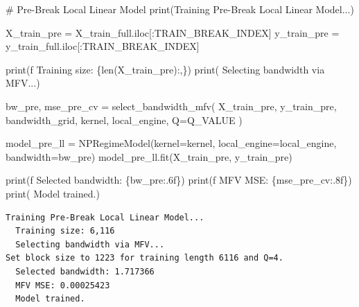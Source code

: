 \documentclass[
  letterpaper,
  DIV=11,
  numbers=noendperiod]{scrartcl}
\newenvironment{Shaded}{\begin{snugshade}}{\end{snugshade}}
\newcommand{\BuiltInTok}[1]{\textcolor[rgb]{0.00,0.23,0.31}{#1}}
\newcommand{\CommentTok}[1]{\textcolor[rgb]{0.37,0.37,0.37}{#1}}
\newcommand{\NormalTok}[1]{\textcolor[rgb]{0.00,0.23,0.31}{#1}}
\newcommand{\OperatorTok}[1]{\textcolor[rgb]{0.37,0.37,0.37}{#1}}
\newcommand{\SpecialCharTok}[1]{\textcolor[rgb]{0.37,0.37,0.37}{#1}}
\newcommand{\SpecialStringTok}[1]{\textcolor[rgb]{0.13,0.47,0.30}{#1}}
\newcommand{\StringTok}[1]{\textcolor[rgb]{0.13,0.47,0.30}{#1}}
\begin{document}
\begin{Shaded}
\begin{Highlighting}[]
\CommentTok{\# Pre{-}Break Local Linear Model}
\BuiltInTok{print}\NormalTok{(}\StringTok{\textquotesingle{}Training Pre{-}Break Local Linear Model...\textquotesingle{}}\NormalTok{)}

\NormalTok{X\_train\_pre }\OperatorTok{=}\NormalTok{ X\_train\_full.iloc[:TRAIN\_BREAK\_INDEX]}
\NormalTok{y\_train\_pre }\OperatorTok{=}\NormalTok{ y\_train\_full.iloc[:TRAIN\_BREAK\_INDEX]}

\BuiltInTok{print}\NormalTok{(}\SpecialStringTok{f\textquotesingle{}  Training size: }\SpecialCharTok{\{}\BuiltInTok{len}\NormalTok{(X\_train\_pre)}\SpecialCharTok{:,\}}\SpecialStringTok{\textquotesingle{}}\NormalTok{)}
\BuiltInTok{print}\NormalTok{(}\StringTok{\textquotesingle{}  Selecting bandwidth via MFV...\textquotesingle{}}\NormalTok{)}

\NormalTok{bw\_pre, mse\_pre\_cv }\OperatorTok{=}\NormalTok{ select\_bandwidth\_mfv(}
\NormalTok{    X\_train\_pre, y\_train\_pre, bandwidth\_grid, kernel, local\_engine, Q}\OperatorTok{=}\NormalTok{Q\_VALUE}
\NormalTok{)}

\NormalTok{model\_pre\_ll }\OperatorTok{=}\NormalTok{ NPRegimeModel(kernel}\OperatorTok{=}\NormalTok{kernel, local\_engine}\OperatorTok{=}\NormalTok{local\_engine, bandwidth}\OperatorTok{=}\NormalTok{bw\_pre)}
\NormalTok{model\_pre\_ll.fit(X\_train\_pre, y\_train\_pre)}

\BuiltInTok{print}\NormalTok{(}\SpecialStringTok{f\textquotesingle{}  Selected bandwidth: }\SpecialCharTok{\{}\NormalTok{bw\_pre}\SpecialCharTok{:.6f\}}\SpecialStringTok{\textquotesingle{}}\NormalTok{)}
\BuiltInTok{print}\NormalTok{(}\SpecialStringTok{f\textquotesingle{}  MFV MSE: }\SpecialCharTok{\{}\NormalTok{mse\_pre\_cv}\SpecialCharTok{:.8f\}}\SpecialStringTok{\textquotesingle{}}\NormalTok{)}
\BuiltInTok{print}\NormalTok{(}\StringTok{\textquotesingle{}  Model trained.\textquotesingle{}}\NormalTok{)}
\end{Highlighting}
\end{Shaded}

\begin{verbatim}
Training Pre-Break Local Linear Model...
  Training size: 6,116
  Selecting bandwidth via MFV...
Set block size to 1223 for training length 6116 and Q=4.
  Selected bandwidth: 1.717366
  MFV MSE: 0.00025423
  Model trained.
\end{verbatim}
\end{document}
